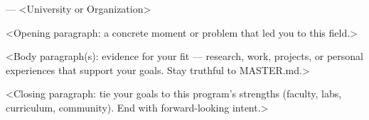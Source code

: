 \documentclass[12pt]{article}
\begin{document}
{\Large\bfseries <Your Full Name>}\par
{ --- <University or Organization>}\par
\vspace{1em}


<Opening paragraph: a concrete moment or problem that led you to this field.>

<Body paragraph(s): evidence for your fit --- research, work, projects, or
personal experiences that support your goals. Stay truthful to MASTER.md.>

<Closing paragraph: tie your goals to this program's strengths (faculty, labs,
curriculum, community). End with forward-looking intent.>
\end{document}
